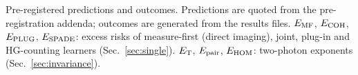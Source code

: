 \begin{table}[t]
\caption{Pre-registered predictions and outcomes. Predictions are quoted from the pre-registration addenda;
outcomes are generated from the results files. $E_{\rm MF}$, $E_{\rm COH}$, $E_{\rm PLUG}$, $E_{\rm SPADE}$: excess
risks of measure-first (direct imaging), joint, plug-in and HG-counting learners (Sec.~\ref{sec:single}).
$E_{\rm T}$, $E_{\rm pair}$, $E_{\rm HOM}$: two-photon exponents (Sec.~\ref{sec:invariance}).}
\label{tab:prereg}
\footnotesize

\end{table}
